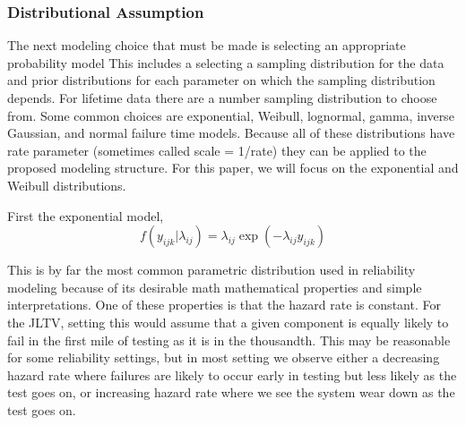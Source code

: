 \documentclass[12pt]{article}
\begin{document}
\subsubsection{Distributional Assumption}
The next modeling choice that must be made is selecting an appropriate
probability model This includes a selecting a sampling distribution for the data
and prior distributions for each parameter on which the sampling distribution
depends.  For lifetime data there are a number sampling distribution to choose
from.  Some common choices are exponential, Weibull, lognormal, gamma, inverse
Gaussian, and normal failure time models.  Because all of these distributions
have rate parameter (sometimes called scale = 1/rate) they can be applied to
the proposed modeling structure.  For this paper, we will focus on the
exponential and Weibull distributions.

First the exponential model,
\begin{equation*}
    f(y_{ijk}|\lambda_{ij})=\lambda_{ij} \exp(-\lambda_{ij}y_{ijk})
\end{equation*}

This is by far the most common parametric distribution used in reliability
modeling because of its desirable math mathematical properties and simple
interpretations.  One of these properties is that the hazard rate is constant.
For the JLTV, setting this would assume that a given component is equally likely
to fail in the first mile of testing as it is in the thousandth.  This may be
reasonable for some reliability settings, but in most setting we observe either
a decreasing hazard rate where failures are likely to occur early in testing
but less likely as the test goes on, or increasing hazard rate where we see the
system wear down as the test goes on.
\end{document}
